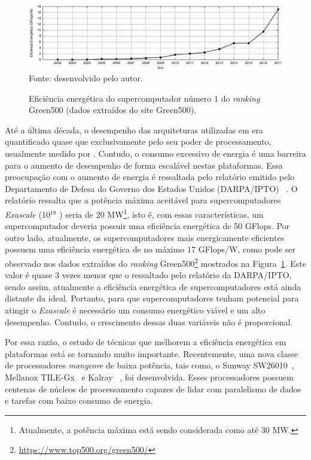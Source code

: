 
\begin{figure}[t]
	\centering
	\caption{Eficiência energética do supercomputador número 1 do
        \textit{ranking} Green500 (dados extraídos do site Green500).}
    \includegraphics[width=\textwidth]{figs/green500.pdf} \\
    Fonte: desenvolvido pelo autor.
	\label{fig:graphEnergy}
\end{figure}


Até a última década, o desempenho das arquiteturas utilizadas em \hpc era quantificado quase
que exclusivamente pelo seu poder de processamento, usualmente medido por
\flops. Contudo, o consumo excessivo de energia é uma barreira para o aumento de
desempenho de forma escalável nestas plataformas.
Essa preocupação com o aumento de energia é ressaltada pelo relatório emitido
pelo Departamento de Defesa do Governo dos Estados Unidos (DARPA/IPTO)
~\cite{Kogge2008}. O relatório ressalta que a potência máxima aceitável para supercomputadores
\textit{Exascale} (10$^{18}$ \flops) seria de 20 MW\footnote{Atualmente, a
    potência máxima está sendo considerada como até 30 MW.}, isto é, com
essas características, um supercomputador deveria possuir uma eficiência
energética de 50 GFlops.
Por outro lado, atualmente, os supercomputadores mais energicamente eficientes
possuem uma eficiência energética de no máximo $17$ GFlops/W, como pode ser observado nos dados extraídos do \textit{ranking}
Green500\footnote{\url{https://www.top500.org/green500/}} mostrados na Figura~\ref{fig:graphEnergy}.
Este valor é quase 3 vezes menor que o ressaltado pelo
relatório da DARPA/IPTO, sendo assim, atualmente a eficiência energética de
supercomputadores está ainda distante da ideal. Portanto, para que
supercomputadores tenham potencial para atingir o \textit{Exascale} é necessário
um consumo energético viável e um alto desempenho. Contudo, o crescimento dessas
duas variáveis não é proporcional.


Por essa razão, o estudo de técnicas que melhorem a eficiência energética em
plataformas \hpc está se tornando muito importante.  Recentemente, uma nova
classe de processadores \textit{manycore} de baixa potência, tais como, o Sunway
SW26010~\cite{sunway:2016}, Mellanox TILE-Gx~\cite{Valero:2012} e Kalray
\mppa~\cite{Castro-IA3:2013}, foi desenvolvida. Esses processadores possuem
centenas de núcleos de processamento capazes de lidar com paralelismo de dados e
tarefas com baixo consumo de energia.

